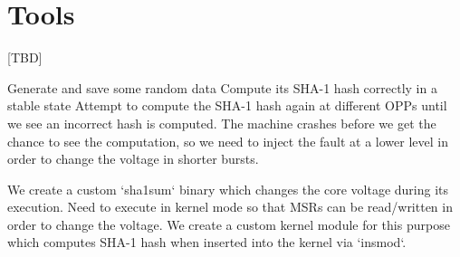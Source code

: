 \section{Tools}

[TBD]

Generate and save some random data
Compute its SHA-1 hash correctly in a stable state
Attempt to compute the SHA-1 hash again at different OPPs until we see an
incorrect hash is computed. The machine crashes before we get the chance to see
the computation, so we need to inject the fault at a lower level in order to
change the voltage in shorter bursts.

We create a custom `sha1sum` binary which changes the core voltage during its
execution.
Need to execute in kernel mode so that MSRs can be read/written in order to
change the voltage.
We create a custom kernel module for this purpose which computes SHA-1 hash
when inserted into the kernel via `insmod`.
